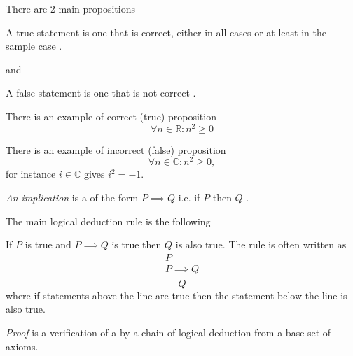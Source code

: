 There are 2 main propositions
\begin{definition}[True]
\label{def:true}
A true statement is one that is correct, either in all cases or at
least in the sample case \cite{bib:studycom:truefalse}. 
\end{definition}
and
\begin{definition}[False]
\label{def:false}
A false statement is one that is not correct \cite{bib:studycom:truefalse}. 
\end{definition}


\begin{example}[Proposition]
\label{ex:proposition}
There is an example of correct (true) proposition
\[
\forall n \in \mathbb{R}: n^2 \ge 0
\]

There is an example of incorrect (false) proposition
\[
\forall n \in \mathbb{C}: n^2 \ge 0,
\]
for instance $i \in \mathbb{C}$ gives $i^2 = -1$.

\end{example}

\begin{definition}[Implication]
\label{def:implication} \textit{An implication} is a
 of the form $P \implies Q$ i.e. if $P$
then $Q$ \cite{bib:whatisaproof}.
\end{definition}

The main logical deduction rule is the following
\begin{definition}
\label{def:modusponens}
If $P$ is true and $P \implies Q$ is true then $Q$ is also true. The
rule is often written as \cite{bib:whatisaproof}
\[
\frac{
\begin{array}{c}
P \\
P \implies Q
\end{array}
}{Q}
\]
where if statements above the line are true then the statement below
the line is also true.
\end{definition}

\begin{definition}[Proof]
\label{def:proof}
\textit{Proof} is a verification \cite{bib:whatisaproof} of a
 by a chain of logical deduction from a
base set of axioms.
\end{definition}

